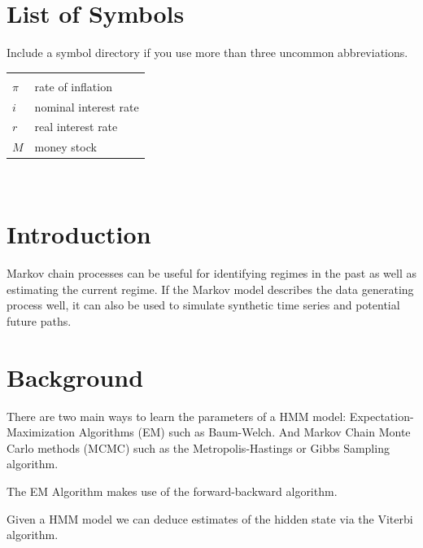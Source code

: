\documentclass[11pt,a4paper]{article}
\begin{document}
\section*{List of Symbols} 
\noindent Include a symbol directory if you use more than three uncommon abbreviations.
	\begin{tabular}{l l}
		\textbf{} & \\
		$\pi$ & rate of inflation\\
		$i$ & nominal interest rate \\
		$r$ & real interest rate \\
		$M$ & money stock \\


	\end{tabular}\\ \vspace{1cm}


\newpage


\pagestyle{fancy}						
\fancyhf{}								
\fancyhead[R]{}							 
\renewcommand{\headrulewidth}{0pt}	 
\fancyfoot[R]{\thepage}				 
\renewcommand{\footrulewidth}{0pt}	 
\onehalfspacing	
\section{Introduction}
Markov chain processes can be useful for identifying regimes in the past as well as estimating the current regime. %
If the Markov model describes the data generating process well, it can also be used to simulate synthetic time series and potential future paths. %

\section{Background}

There are two main ways to learn the parameters of a HMM model: Expectation-Maximization Algorithms (EM) such as Baum-Welch. And Markov Chain Monte Carlo methods (MCMC) such as the Metropolis-Hastings or Gibbs Sampling algorithm.

The EM Algorithm makes use of the forward-backward algorithm.

Given a HMM model we can deduce estimates of the hidden state via the Viterbi algorithm.
\end{document}
